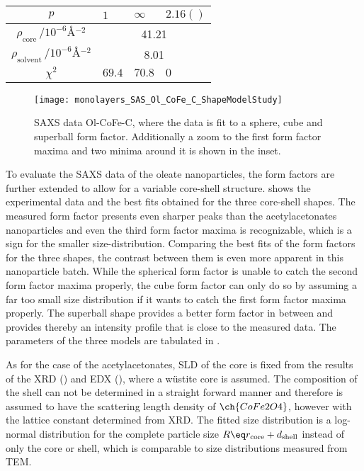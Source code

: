 \documentclass[\main/dresen_thesis.tex]{subfiles}
\begin{document}
\begin{table}[ht]
\begin{tabular}{ c | l | l | l }
        \rule{0pt}{2ex} $p$                                           & $1$            & $\infty$   & $2.16()$\\
        \hline
        \rule{0pt}{2ex} $\rho_\mathrm{core}    \, / \unit{10^{-6} \angstrom^{-2}}$     & \multicolumn{3}{c}{41.21}\\
        \rule{0pt}{2ex} $\rho_\mathrm{solvent} \, / \unit{10^{-6} \angstrom^{-2}}$     & \multicolumn{3}{c}{8.01}\\
        \hline
        \rule{0pt}{2ex} $\chi^2$                                      & $69.4$         & $70.8$     & $0$\\
        \hline
      \end{tabular}
    \end{table}

  \begin{figure}[tb]
    \centering
    \texttt{[image: monolayers\_SAS\_Ol\_CoFe\_C\_ShapeModelStudy]}
    \caption{\label{fig:monolayers:nanoparticle:sas:OlCoFeC}SAXS data Ol-CoFe-C, where the data is fit to a sphere, cube and superball form factor. Additionally a zoom to the first form factor maxima and two minima around it is shown in the inset.}
  \end{figure}
  To evaluate the SAXS data of the oleate nanoparticles, the form factors are further extended to allow for a variable core-shell structure.
   shows the experimental data and the best fits obtained for the three core-shell shapes.
  The measured form factor presents even sharper peaks than the acetylacetonates nanoparticles and even the third form factor maxima is recognizable, which is a sign for the smaller size-distribution.
  Comparing the best fits of the form factors for the three shapes, the contrast between them is even more apparent in this nanoparticle batch.
  While the spherical form factor is unable to catch the second form factor maxima properly, the cube form factor can only do so by assuming a far too small size distribution if it wants to catch the first form factor maxima properly.
  The superball shape provides a better form factor in between and provides thereby an intensity profile that is close to the measured data.
  The parameters of the three models are tabulated in .

  As for the case of the acetylacetonates, SLD of the core is fixed from the results of the XRD () and EDX (), where a w\"ustite core is assumed.
  The composition of the shell can not be determined in a straight forward manner and therefore is assumed to have the scattering length density of $\ch{CoFe2O4}$, however with the lattice constant determined from XRD.
  The fitted size distribution is a log-normal distribution for the complete particle size $R \eq r_\mathrm{core} + d_\mathrm{shell}$ instead of only the core or shell, which is comparable to size distributions measured from TEM.
\end{document}
